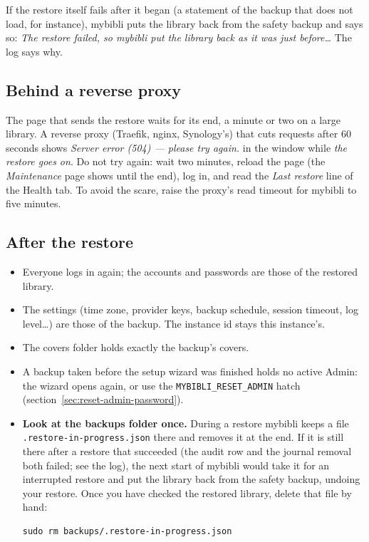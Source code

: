 If the restore itself fails after it began (a statement of the backup
that does not load, for instance), mybibli puts the library back from
the safety backup and says so: \emph{The restore failed, so mybibli put
the library back as it was just before\dots} The log says why.

\subsection*{Behind a reverse proxy}

The page that sends the restore waits for its end, a minute or two on a
large library. A reverse proxy (Traefik, nginx, Synology's) that cuts
requests after 60 seconds shows \emph{Server error (504) --- please try
again.} in the window while \emph{the restore goes on}. Do not try
again: wait two minutes, reload the page (the \emph{Maintenance} page shows until the
end), log in, and read the \emph{Last restore} line of the Health tab.
To avoid the scare, raise the proxy's read timeout for mybibli to five
minutes.

\subsection*{After the restore}

\begin{itemize}
  \item Everyone logs in again; the accounts and passwords are those of
        the restored library.
  \item The settings (time zone, provider keys, backup schedule, session
        timeout, log level\dots) are those of the backup. The instance
        id stays this instance's.
  \item The covers folder holds exactly the backup's covers.
  \item A backup taken before the setup wizard was finished holds no
        active Admin: the wizard opens again, or use the
        \texttt{MYBIBLI\_RESET\_ADMIN} hatch
        (section~\ref{sec:reset-admin-password}).
  \item \textbf{Look at the backups folder once.} During a restore
        mybibli keeps a file \texttt{.restore-\allowbreak in-\allowbreak progress.json} there
        and removes it at the end. If it is still there after a
        restore that succeeded (the audit row and the journal removal
        both failed; see the log), the next start of mybibli would take
        it for an interrupted restore and put the library back from the
        safety backup, undoing your restore. Once you have checked the
        restored library, delete that file by hand:
\begin{lstlisting}
sudo rm backups/.restore-in-progress.json
\end{lstlisting}
\end{itemize}


